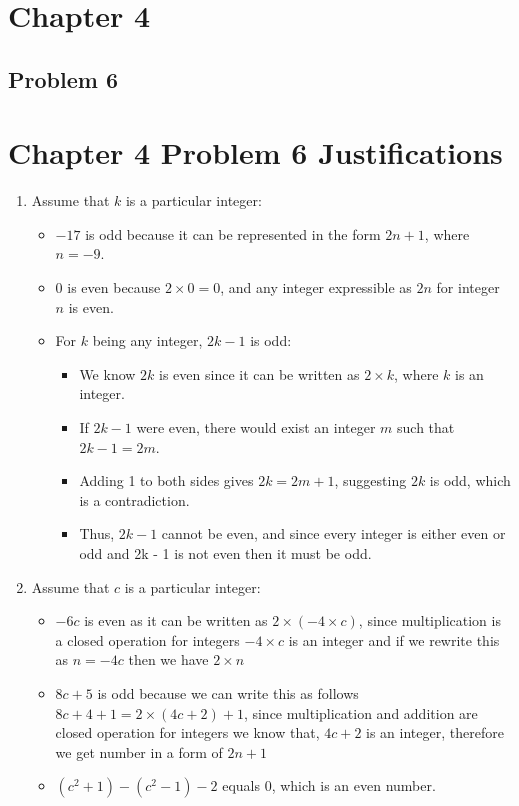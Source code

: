 \documentclass[a4paper, 10pt]{article}
\begin{document}
    \pagebreak
    \section{Chapter 4}

        \subsection{Problem 6}

    \section*{Chapter 4 Problem 6 Justifications}
        \begin{enumerate}
            \item Assume that \( k \) is a particular integer:
            \begin{itemize}
                \item \( -17 \) is odd because it can be represented in the form \( 2n + 1 \), where \( n = -9 \).
                \item \( 0 \) is even because \( 2 \times 0 = 0 \), and any integer expressible as \( 2n \) for integer \( n \) is even.
                \item For \( k \) being any integer, \( 2k - 1 \) is odd:
                    \begin{itemize}
                        \item We know \( 2k \) is even since it can be written as \( 2 \times k \), where \( k \) is an integer.
                        \item If \( 2k - 1 \) were even, there would exist an integer \( m \) such that \( 2k - 1 = 2m \).
                        \item Adding 1 to both sides gives \( 2k = 2m + 1 \), suggesting \( 2k \) is odd, which is a contradiction.
                        \item Thus, \( 2k - 1 \) cannot be even, and since every integer is either even or odd and 2k - 1 is not even then it must be odd.
                    \end{itemize}
            \end{itemize}

            \item Assume that \( c \) is a particular integer:
            \begin{itemize}
                \item \( -6c \) is even as it can be written as \( 2 \times (-4 \times c) \), since multiplication is a closed operation for integers \(-4 \times c\) is an integer and if we rewrite this as \( n = -4c\) then we have \(2 \times n\)
                \item \( 8c + 5 \) is odd because we can write this as follows \( 8c + 4 + 1 = 2 \times (4c + 2) + 1\), since multiplication and addition are closed operation for integers we know that, \(4c + 2\) is an integer, therefore we get number in a form of \(2n + 1\)
                \item \( (c^2 + 1) - (c^2 - 1) - 2\) equals 0, which is an even number.
            \end{itemize}


\end{enumerate}
\end{document}
